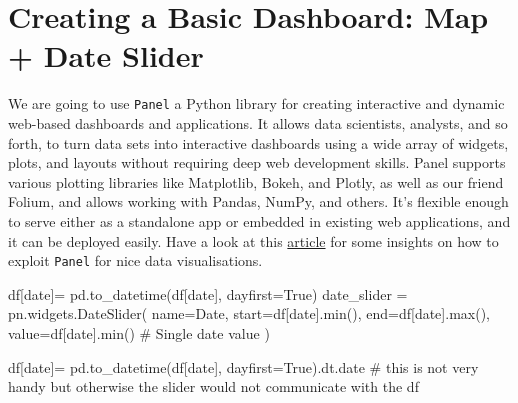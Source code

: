 \documentclass[
  letterpaper,
  DIV=11,
  numbers=noendperiod]{scrreprt}
\newenvironment{Shaded}{\begin{snugshade}}{\end{snugshade}}
\newcommand{\BuiltInTok}[1]{\textcolor[rgb]{0.00,0.23,0.31}{#1}}
\newcommand{\CommentTok}[1]{\textcolor[rgb]{0.37,0.37,0.37}{#1}}
\newcommand{\NormalTok}[1]{\textcolor[rgb]{0.00,0.23,0.31}{#1}}
\newcommand{\OperatorTok}[1]{\textcolor[rgb]{0.37,0.37,0.37}{#1}}
\newcommand{\StringTok}[1]{\textcolor[rgb]{0.13,0.47,0.30}{#1}}
\newcommand{\VariableTok}[1]{\textcolor[rgb]{0.07,0.07,0.07}{#1}}
\begin{document}
\hypertarget{creating-a-basic-dashboard-map-date-slider}{%
\section{Creating a Basic Dashboard: Map + Date
Slider}\label{creating-a-basic-dashboard-map-date-slider}}

We are going to use \texttt{Panel} a Python library for creating
interactive and dynamic web-based dashboards and applications. It allows
data scientists, analysts, and so forth, to turn data sets into
interactive dashboards using a wide array of widgets, plots, and layouts
without requiring deep web development skills. Panel supports various
plotting libraries like Matplotlib, Bokeh, and Plotly, as well as our
friend Folium, and allows working with Pandas, NumPy, and others. It's
flexible enough to serve either as a standalone app or embedded in
existing web applications, and it can be deployed easily. Have a look at
this
\href{https://medium.com/@marcskovmadsen/i-prefer-to-use-panel-for-my-data-apps-here-is-why-1ff5d2b98e8f}{article}
for some insights on how to exploit \texttt{Panel} for nice data
visualisations.

\begin{Shaded}
\begin{Highlighting}[]
\NormalTok{df[}\StringTok{\textquotesingle{}date\textquotesingle{}}\NormalTok{]}\OperatorTok{=}\NormalTok{ pd.to\_datetime(df[}\StringTok{\textquotesingle{}date\textquotesingle{}}\NormalTok{], dayfirst}\OperatorTok{=}\VariableTok{True}\NormalTok{)}
\NormalTok{date\_slider }\OperatorTok{=}\NormalTok{ pn.widgets.DateSlider(}
\NormalTok{    name}\OperatorTok{=}\StringTok{\textquotesingle{}Date\textquotesingle{}}\NormalTok{,}
\NormalTok{    start}\OperatorTok{=}\NormalTok{df[}\StringTok{\textquotesingle{}date\textquotesingle{}}\NormalTok{].}\BuiltInTok{min}\NormalTok{(),}
\NormalTok{    end}\OperatorTok{=}\NormalTok{df[}\StringTok{\textquotesingle{}date\textquotesingle{}}\NormalTok{].}\BuiltInTok{max}\NormalTok{(),}
\NormalTok{    value}\OperatorTok{=}\NormalTok{df[}\StringTok{\textquotesingle{}date\textquotesingle{}}\NormalTok{].}\BuiltInTok{min}\NormalTok{()  }\CommentTok{\# Single date value}
\NormalTok{)}

\NormalTok{df[}\StringTok{\textquotesingle{}date\textquotesingle{}}\NormalTok{]}\OperatorTok{=}\NormalTok{ pd.to\_datetime(df[}\StringTok{\textquotesingle{}date\textquotesingle{}}\NormalTok{], dayfirst}\OperatorTok{=}\VariableTok{True}\NormalTok{).dt.date }\CommentTok{\# this is not very handy but otherwise the slider would not communicate with the df}
\end{Highlighting}
\end{Shaded}
\end{document}
